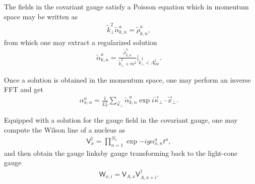 \begin{note}
The fields in the covariant gauge satisfy a Poisson equation which in momentum space may be written as
\begin{align*}
    \widetilde{k}_{\perp}^{2} \widetilde{\alpha}_{k, n}^a=\widetilde{\rho}_{k, n}^{a},
\end{align*}
from which one may extract a regularized solution
\begin{align*}
    \widetilde{\alpha}_{k, n}^a=\frac{\widetilde{\rho}_{k, n}^{a}}{\widetilde{k}_\perp^{2}+m^{2}}\Bigg|_{\widetilde{k}_\perp^{2}<\Lambda_{\textsf{UV}}^{2}}.
\end{align*}
\end{note}

\begin{note}
Once a solution is obtained in the momentum space, one may perform an inverse {\sffamily FFT} and get
\begin{align*}
    \alpha_{x, n}^a=\frac{1}{L_T^2}\sum\limits_{\vec{\kappa}_\perp}\widetilde{\alpha}_{k, n}^a\exp{i\vec{\kappa}_\perp\cdot\vec{x}_\perp}.
\end{align*}
\end{note}

\begin{note}
Equipped with a solution for the gauge field in the covariant gauge, one may compute the Wilson line of a nucleus as
\begin{align*}
    \textsf{V}_{x}^{\dagger}=\prod_{n=1}^{N_{s}} \exp{-i g \alpha_{x, n}^a t^a},
\end{align*}
and then obtain the gauge linksby gauge transforming back to the light-cone gauge
\begin{align*}
    \textsf{W}_{x, i}=\textsf{V}_{A, x} \textsf{V}_{A, x+i}^{\dagger}.
\end{align*}
\end{note}

